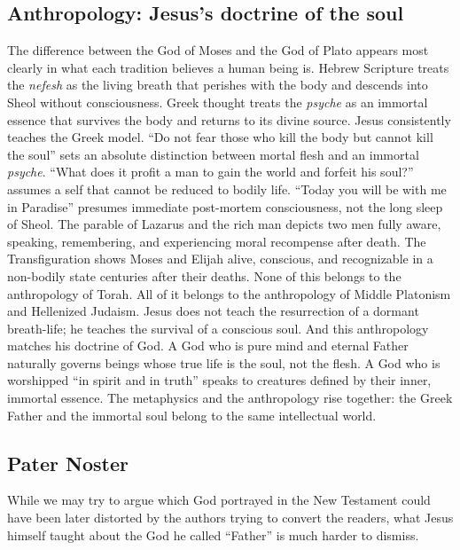 \subsection{Anthropology: Jesus's doctrine of the soul}\label{subsec:jesus-doctrine-of-the-soul}

The difference between the God of Moses and the God of Plato appears most clearly in what each tradition believes a human being is.
Hebrew Scripture treats the \emph{nefesh} as the living breath that perishes with the body and descends into Sheol without consciousness.
Greek thought treats the \emph{psyche} as an immortal essence that survives the body and returns to its divine source.
Jesus consistently teaches the Greek model.
``Do not fear those who kill the body but cannot kill the soul'' sets an absolute distinction between mortal flesh and an immortal \emph{psyche}.
``What does it profit a man to gain the world and forfeit his soul?'' assumes a self that cannot be reduced to bodily life.
``Today you will be with me in Paradise'' presumes immediate post-mortem consciousness, not the long sleep of Sheol.
The parable of Lazarus and the rich man depicts two men fully aware, speaking, remembering, and experiencing moral recompense after death.
The Transfiguration shows Moses and Elijah alive, conscious, and recognizable in a non-bodily state centuries after their deaths.
None of this belongs to the anthropology of Torah.
All of it belongs to the anthropology of Middle Platonism and Hellenized Judaism.
Jesus does not teach the resurrection of a dormant breath-life; he teaches the survival of a conscious soul.
And this anthropology matches his doctrine of God.
A God who is pure mind and eternal Father naturally governs beings whose true life is the soul, not the flesh.
A God who is worshipped ``in spirit and in truth'' speaks to creatures defined by their inner, immortal essence.
The metaphysics and the anthropology rise together: the Greek Father and the immortal soul belong to the same intellectual world.

\subsection{Pater Noster}\label{subsec:pater-noster}
While we may try to argue which God portrayed in the New Testament could have been later distorted by the authors trying to convert the readers, what Jesus himself taught about the God he called “Father” is much harder to dismiss.

